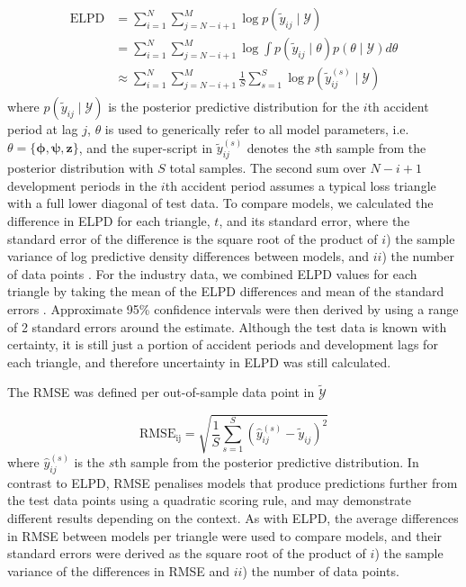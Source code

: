 \begin{align}
	\label{eq:elpd}
	\begin{split}
	\mathrm{ELPD} &= \sum_{i=1}^{N} \sum_{j=N - i + 1}^{M} 
					\log p(\tilde{y}_{ij} \mid \mathcal{Y})\\
				 &=	\sum_{i=1}^{N} \sum_{j=N - i + 1}^{M} 
					\log \int p(\tilde{y}_{ij} \mid \theta)
					p(\theta \mid \mathcal{Y})
					d \theta \\
				 &\approx \sum_{i=1}^{N} \sum_{j=N - i + 1}^{M} 
					\frac{1}{S} \sum_{s=1}^{S} 
					\log p(\tilde{y}_{ij}^{(s)} \mid \mathcal{Y})
	\end{split}
\end{align}
%
where $p(\tilde{y}_{ij} \mid \mathcal{Y})$
is the posterior predictive distribution for
the $i$th accident period at lag $j$,
$\theta$ is used to generically refer to all
model parameters, i.e. $\theta = \{\bm{\phi}, \bm{\psi}, \bm{z}\}$,
and the super-script in $\tilde{y}_{ij}^{(s)}$ denotes the
$s$th sample from the posterior distribution with $S$
total samples.
The second sum over $N - i + 1$ development periods in the
$i$th accident period assumes a typical loss triangle
with a full lower diagonal of test data.
To compare models, we
calculated the difference in ELPD for each triangle, $t$,
and its standard error,
where the standard error of the difference is the
square root of the product of $i$) the sample variance of log predictive
density differences between models, and $ii$) 
the number of data points \citep{vehtari2017,sivula2020}.
For the industry data, we combined ELPD values for each
triangle by taking the mean of the ELPD differences and 
mean of the standard errors \citep{sivula2020}. 
Approximate 95\% confidence intervals were then derived
by using a range of 2 standard errors around the estimate.
Although the test data is known with certainty,
it is still just a portion of accident periods
and development lags
for each triangle, and therefore uncertainty
in ELPD was still calculated.

The RMSE was defined per out-of-sample data point in
$\tilde{\mathcal{Y}}$

\begin{equation}
	\label{eq:rmse}
	\mathrm{RMSE_{ij}} = \sqrt{\frac{1}{S} \sum_{s=1}^{S} (\hat{y}_{ij}^{(s)} - \tilde{y}_{ij})^2}
\end{equation}
%
where $\hat{y}_{ij}^{(s)}$ is the $s$th sample from the 
posterior predictive distribution.
In contrast to ELPD, RMSE penalises models that produce
predictions further from the test data points using a
quadratic scoring rule,
and may demonstrate different results depending
on the context.
As with ELPD, the average differences in RMSE
between models per triangle were used to compare models, and 
their standard errors were derived as the square root
of the product of $i$) the sample variance of the differences
in RMSE and $ii$) the number of data points.

